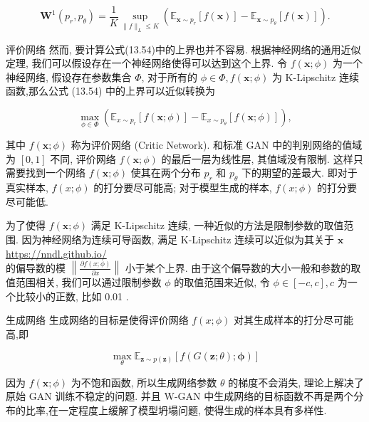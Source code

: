 \documentclass[10pt]{article}
\begin{document}
\begin{equation*}
\boldsymbol{W}^{1}\left(p_{r}, p_{\theta}\right)=\frac{1}{K} \sup _{\|f\|_{L} \leq K}\left(\mathbb{E}_{\boldsymbol{x} \sim p_{r}}[f(\boldsymbol{x})]-\mathbb{E}_{\boldsymbol{x} \sim p_{\theta}}[f(\boldsymbol{x})]\right) . \tag{13.54}
\end{equation*}


评价网络 然而, 要计算公式(13.54)中的上界也并不容易. 根据神经网络的通用近似定理, 我们可以假设存在一个神经网络使得可以达到这个上界. 令 $f(\boldsymbol{x} ; \phi)$ 为一个神经网络, 假设存在参数集合 $\Phi$, 对于所有的 $\phi \in \Phi, f(\boldsymbol{x} ; \phi)$ 为 K-Lipschitz 连续函数,那么公式 (13.54) 中的上界可以近似转换为


\begin{equation*}
\max _{\phi \in \Phi}\left(\mathbb{E}_{x \sim p_{r}}[f(\boldsymbol{x} ; \phi)]-\mathbb{E}_{x \sim p_{\theta}}[f(\boldsymbol{x} ; \phi)]\right), \tag{13.55}
\end{equation*}


其中 $f(\boldsymbol{x} ; \phi)$ 称为评价网络 (Critic Network). 和标准 GAN 中的判别网络的值域为 $[0,1]$ 不同, 评价网络 $f(\boldsymbol{x} ; \phi)$ 的最后一层为线性层, 其值域没有限制. 这样只需要找到一个网络 $f(\boldsymbol{x} ; \phi)$ 使其在两个分布 $p_{r}$ 和 $p_{\theta}$ 下的期望的差最大. 即对于真实样本, $f(x ; \phi)$ 的打分要尽可能高; 对于模型生成的样本, $f(x ; \phi)$ 的打分要尽可能低.

为了使得 $f(\boldsymbol{x} ; \phi)$ 满足 K-Lipschitz 连续, 一种近似的方法是限制参数的取值范围. 因为神经网络为连续可导函数, 满足 K-Lipschitz 连续可以近似为其关于 $\boldsymbol{x}$ \href{https://nndl.github.io/}{https://nndl.github.io/}\\
的偏导数的模 $\left\|\frac{\partial f(x ; \phi)}{\partial x}\right\|$ 小于某个上界. 由于这个偏导数的大小一般和参数的取值范围相关, 我们可以通过限制参数 $\phi$ 的取值范围来近似, 令 $\phi \in[-c, c], c$ 为一个比较小的正数, 比如 0.01 .

生成网络 生成网络的目标是使得评价网络 $f(x ; \phi)$ 对其生成样本的打分尽可能高,即


\begin{equation*}
\max _{\theta} \mathbb{E}_{\boldsymbol{z} \sim p(\boldsymbol{z})}[f(G(\boldsymbol{z} ; \theta) ; \boldsymbol{\phi})] \tag{13.56}
\end{equation*}


因为 $f(\boldsymbol{x} ; \phi)$ 为不饱和函数, 所以生成网络参数 $\theta$ 的梯度不会消失, 理论上解决了原始 GAN 训练不稳定的问题. 并且 W-GAN 中生成网络的目标函数不再是两个分布的比率,在一定程度上缓解了模型坍塌问题, 使得生成的样本具有多样性.
\end{document}
